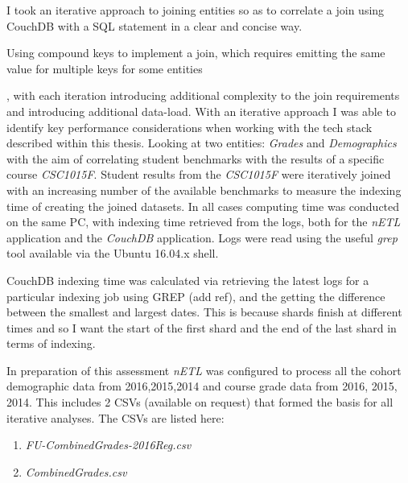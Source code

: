 

I took an iterative approach to joining entities so as to correlate a join using CouchDB with a SQL statement in a clear and concise way.


Using compound keys to implement a join, which requires emitting the same value for multiple keys for some entities























, with each iteration introducing additional complexity to the join requirements and introducing additional data-load. With an iterative approach I was able to identify key performance considerations when working with the tech stack described within this thesis. Looking at two entities: \textit{Grades} and \textit{Demographics} with the aim of correlating student benchmarks with the results of a specific course \textit{CSC1015F}. Student results from the \textit{CSC1015F} were iteratively joined with an increasing number of the available benchmarks to measure the indexing time of creating the joined datasets. In all cases computing time was conducted on the same PC, with indexing time retrieved from the logs, both for the \textit{nETL} application and the \textit{CouchDB} application. Logs were read using the useful \textit{grep} tool available via the Ubuntu 16.04.x shell.

CouchDB indexing time was calculated via retrieving the latest logs for a particular indexing job using GREP (add ref), and the getting the difference between the smallest and largest dates. This is because shards finish at different times and so I want the start of the first shard and the end of the last shard in terms of indexing.

In preparation of this assessment \textit{nETL} was configured to process all the cohort demographic data from 2016,2015,2014 and course grade data from 2016, 2015, 2014. This includes 2 CSVs (available on request) that formed the basis for all iterative analyses. The CSVs are listed here:

\begin{enumerate}
    \item \textit{FU-CombinedGrades-2016Reg.csv}
    \item \textit{CombinedGrades.csv}
\end{enumerate}



